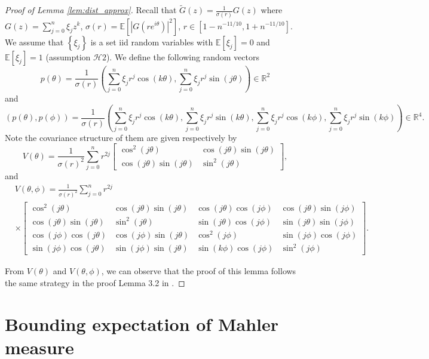 \documentclass[12pt]{amsart}
\theoremstyle{plain}
\numberwithin{equation}{section}
\newcommand{\<}{\langle}
\renewcommand{\>}{\rangle}
\newcommand{\PP}[1]{\left(#1\right)}
\newcommand{\CC}[1]{\left[#1\right]}
\newcommand{\LL}[1]{\left\{#1\right\}}
\newcommand{\R}{\mathds{R}}
\newcommand{\E}[2][ ]{\mathbb{E}{#1}\left[#2\right]}
\newcommand{\abs}[1]{\left|#1\right|}
\begin{document}
\begin{proof}[Proof of Lemma \ref{lem:dist_approx}]
Recall that $\tilde{G}(z) = \frac{1}{\sigma(r)} G(z)$ where $G(z) = \sum_{j=0}^{n} \xi_j z^k$, $\sigma(r) = \E{\abs{G(re^{i\theta})}^2}$, $r\in [1-n^{-11/10}, 1+ n^{-11/10}]$. We assume that $\LL{\xi_j}$ is a set iid random variables with $\E{\xi_j}=0$ and $\E{\xi_j}=1$ (assumption $\mathcal{H}2$). We define the following random vectors
\[
p(\theta) = \frac{1}{\sigma(r)} \PP{ \sum_{j=0}^{n} \xi_j r^j \cos(k\theta), \sum_{j=0}^{n} \xi_j r^{j} \sin(j\theta) } \in \R^2
\]
and 
\[
(p(\theta),p(\phi)) =  \frac{1}{\sigma(r)} \PP{\sum_{j=0}^{n} \xi_j r^j \cos(k\theta),\sum_{j=0}^{n} \xi_j r^j \sin(k\theta), \sum_{j=0}^{n} \xi_j r^j \cos(k\phi), \sum_{j=0}^{n} \xi_j r^j \sin(k\phi) } \in \R^4.
\]
Note the covariance structure of them are given respectively by
\begin{equation}\label{eqn:var_r2}
V(\theta) = \frac{1}{\sigma(r)^2} \sum_{j=0}^{n} r^{2j} 
\CC{
\begin{array}{cc}
\cos^2(j\theta) & \cos(j\theta)\sin(j\theta)\\
 \cos(j\theta)\sin(j\theta) & \sin^2(j\theta)
\end{array}
},
\end{equation}
and
\begin{align}\label{eqn:var_r4}
& V(\theta,\phi) = \frac{1}{\sigma(r)^2} \sum_{j=0}^{n} r^{2j}  \\
& \times \CC{
\begin{array}{cccc}
\cos^2(j\theta) & \cos(j\theta)\sin(j\theta) & \cos(j\theta)\cos(j\phi) & \cos(j\theta)\sin(j\phi) \\
\cos(j\theta)\sin(j\theta) & \sin^2(j\theta) & \sin(j\theta)\cos(j\phi) & \sin(j\theta)\sin(j\phi) \\
\cos(j\phi)\cos(j\theta) & \cos(j\phi)\sin(j\theta) & \cos^2(j\phi) & \sin(j\phi)\cos(j\phi) \\
\sin(j\phi)\cos(j\theta) & \sin(j\phi)\sin(j\theta) & \sin(k\phi)\cos(j\phi) & \sin^2(j\phi)
\end{array}
}. \nonumber
\end{align}

From $V(\theta)$ and $V(\theta,\phi)$, we can observe that the proof of this lemma  follows the same strategy in the proof Lemma 3.2 in \cite{yakir2021approximately}.
\end{proof}

\section{Bounding expectation of Mahler measure} \label{sec:expectation.mahler.measure}
\end{document}
